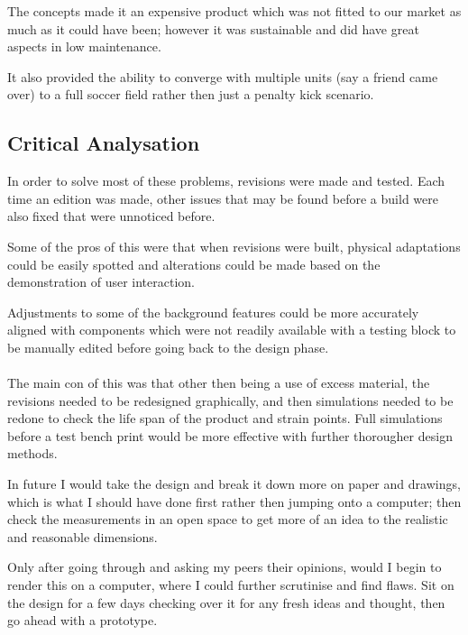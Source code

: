 \documentclass[a4paper, 10pt]{IEEEconf}
\begin{document}
The concepts made it an expensive product which was not fitted to our market as much as it could have been; however it was sustainable and did have great aspects in low maintenance. 

It also provided the ability to converge with multiple units (say a friend came over) to a full soccer field rather then just a penalty kick scenario.


\subsection{Critical Analysation}


In order to solve most of these problems, revisions were made and tested. Each time an edition was made, other issues that may be found before a build were also fixed that were unnoticed before. 

Some of the pros of this were that when revisions were built, physical adaptations could be easily spotted and alterations could be made based on the demonstration of user interaction. 

Adjustments to some of the background features could be more accurately aligned with components which were not readily available with a testing block to be manually edited before going back to the design phase.
\\
\\

The main con of this was that other then being a use of excess material, the revisions needed to be redesigned graphically, and then simulations needed to be redone to check the life span of the product and strain points. Full simulations before a test bench print would be more effective with further thorougher design methods.

In future I would take the design and break it down more on paper and drawings, which is what I should have done first rather then jumping onto a computer; then check the measurements in an open space to get more of an idea to the realistic and reasonable dimensions. 

Only after going through and asking my peers their opinions, would I begin to render this on a computer, where I could further scrutinise and find flaws. Sit on the design for a few days checking over it for any fresh ideas and thought, then go ahead with a prototype.
\end{document}
